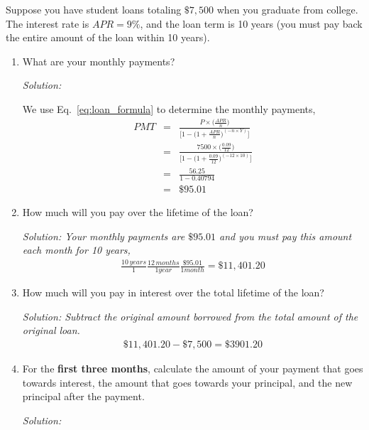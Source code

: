 \documentclass[12pt]{article}
\begin{document}
\pagebreak

Suppose you have student loans totaling $\$7,500$ when you graduate from college.  The interest rate is $APR=9\%$, and the loan term is 10 years (you must pay back the entire amount of the loan within 10 years).

\begin{enumerate}
\item What are your monthly payments?

{\it Solution:

We use Eq.~\eqref{eq:loan_formula} to determine the monthly payments,
\begin{eqnarray*}
	PMT &=& \frac{P\times \Big(\frac{APR}{n} \Big)}{\Big[1 - \Big(1 + \frac{APR}{n}\Big)^{(-n\times Y)}\Big]} \\
	&=& \frac{7500\times \Big(\frac{0.09}{12} \Big)}{\Big[1 - \Big(1 + \frac{0.09}{12}\Big)^{(-12\times 10)}\Big]} \\
	&=& \frac{56.25}{1 - 0.40794} \\
	&=& \$95.01	
\end{eqnarray*}

}
\item How much will you pay over the lifetime of the loan?

{\it Solution:
Your monthly payments are $\$95.01$ and you must pay this amount each month for 10 years,
\begin{eqnarray*}
	\frac{10\, years}{1}\frac{12\, months}{1 year}\frac{\$95.01}{1 month} = \$11,401.20
\end{eqnarray*}

}
\item How much will you pay in interest over the total lifetime of the loan?

{\it Solution:
Subtract the original amount borrowed from the total amount of the original loan.
\begin{eqnarray*}
	\$11,401.20 - \$ 7,500 = \$ 3901.20
\end{eqnarray*}

}

\item For the {\bf first three months}, calculate the amount of your payment that goes towards interest, the amount that goes towards your principal, and the new principal after the payment.

{\it Solution:

}
\end{enumerate}
\end{document}

